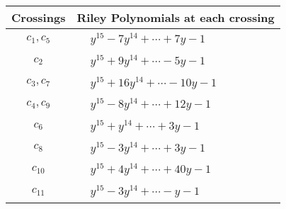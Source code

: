 \documentclass[1p]{elsarticle_modified}
\theoremstyle{definition}
\begin{document}
\begin{tabular}{m{50pt}|m{274pt}}
Crossings & \hspace{64pt}Riley Polynomials at each crossing \\
\hline $$\begin{aligned}c_{1},c_{5}\end{aligned}$$&$\begin{aligned}
&y^{15}-7 y^{14}+\cdots+7 y-1
\end{aligned}$\\
\hline $$\begin{aligned}c_{2}\end{aligned}$$&$\begin{aligned}
&y^{15}+9 y^{14}+\cdots-5 y-1
\end{aligned}$\\
\hline $$\begin{aligned}c_{3},c_{7}\end{aligned}$$&$\begin{aligned}
&y^{15}+16 y^{14}+\cdots-10 y-1
\end{aligned}$\\
\hline $$\begin{aligned}c_{4},c_{9}\end{aligned}$$&$\begin{aligned}
&y^{15}-8 y^{14}+\cdots+12 y-1
\end{aligned}$\\
\hline $$\begin{aligned}c_{6}\end{aligned}$$&$\begin{aligned}
&y^{15}+y^{14}+\cdots+3 y-1
\end{aligned}$\\
\hline $$\begin{aligned}c_{8}\end{aligned}$$&$\begin{aligned}
&y^{15}-3 y^{14}+\cdots+3 y-1
\end{aligned}$\\
\hline $$\begin{aligned}c_{10}\end{aligned}$$&$\begin{aligned}
&y^{15}+4 y^{14}+\cdots+40 y-1
\end{aligned}$\\
\hline $$\begin{aligned}c_{11}\end{aligned}$$&$\begin{aligned}
&y^{15}-3 y^{14}+\cdots- y-1
\end{aligned}$\\
\hline
\end{tabular}\\~\\
\end{document}
